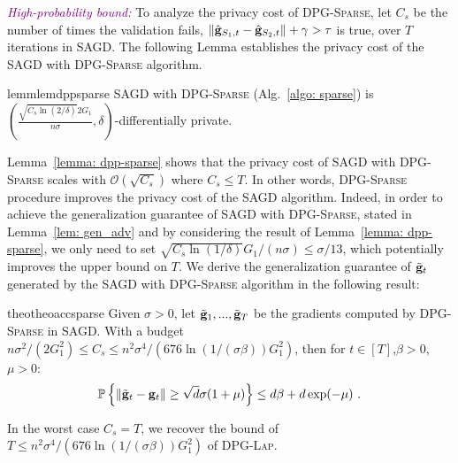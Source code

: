 \documentclass[11pt]{article}
\begin{document}
\textcolor{purple}{\textit{High-probability bound:}}
To analyze the privacy cost of \textsc{DPG-Sparse}, let $C_{s}$ be the number of times the validation fails, \ie $\| \hat {\mathbf{g}}_{S_1,t} - \hat {\mathbf{g}}_{S_2,t}\| + \gamma >  \tau$ is true, over $T$ iterations in \textsc{SAGD}. The following Lemma establishes the privacy cost of the \textsc{SAGD} with \textsc{DPG-Sparse} algorithm.
\begin{restatable}{lemm}{lemdppsparse}
\label{lemma: dpp-sparse}
\textsc{SAGD} with \textsc{DPG-Sparse}  (Alg.~\ref{algo: sparse}) is  
$(\frac{\sqrt{C_{s} \ln(2/\delta)} 2G_1}{n\sigma}, \delta)$-differentially private. 
\end{restatable}
Lemma~\ref{lemma: dpp-sparse} shows that the privacy cost of  \textsc{SAGD} with \textsc{DPG-Sparse} scales with $\mathcal{O}(\sqrt{C_{s}})$ where $C_{s} \leq T$. 
In other words, \textsc{DPG-Sparse} procedure improves the privacy cost of the \textsc{SAGD} algorithm. 
Indeed, in order to achieve the generalization guarantee of \textsc{SAGD} with \textsc{DPG-Sparse}, stated in Lemma~\ref{lem: gen_adv} and  by considering the result of Lemma~\ref{lemma: dpp-sparse},  we only need to set $\sqrt{C_{s} \ln(1/\delta)} G_1/(n\sigma) \leq \sigma/13$, which potentially improves the upper bound on $T$. 
We derive the generalization guarantee of $\tilde {\mathbf{g}}_t$ generated by the \textsc{SAGD} with \textsc{DPG-Sparse} algorithm in the following result:
\begin{restatable}{theo}{theoaccsparse}
\label{thm: acc_sparse}
Given $\sigma > 0$, let $\tilde {\mathbf{g}}_1,...,  \tilde {\mathbf{g}}_T$ be the gradients computed by \textsc{DPG-Sparse} in \textsc{SAGD}. With a budget $ n\sigma^2/(2G_1^2) \leq C_{s} \leq n^2 \sigma^4/(676 \ln(1/(\sigma \beta))G_1^2)$, then for $t \in [T]$,$\beta > 0$, $\mu > 0$:
        \begin{equation*}
    \mathbb{P}\left\{\|\tilde {\mathbf{g}}_t - \mathbf{g}_t\| \geq \sqrt{d}\sigma(1+\mu)\right\} \leq d\beta + d\exp(-\mu)~.
    \end{equation*}
\end{restatable}
In the worst case $C_{s} = T$, we recover the bound of $T \leq n^2 \sigma^4/(676 \ln(1/(\sigma \beta))G_1^2)$ of \textsc{DPG-Lap}.
\end{document}
